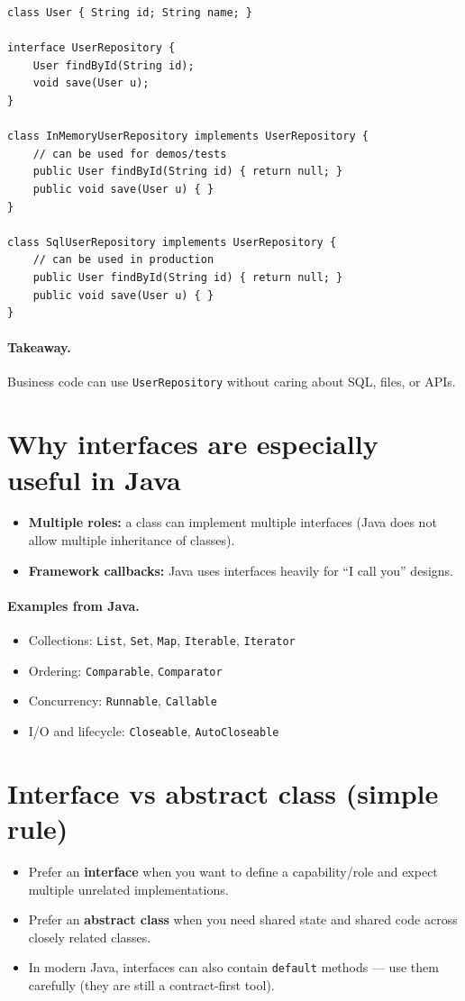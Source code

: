 \documentclass[11pt]{article}
\begin{document}
\begin{lstlisting}
class User { String id; String name; }

interface UserRepository {
    User findById(String id);
    void save(User u);
}

class InMemoryUserRepository implements UserRepository {
    // can be used for demos/tests
    public User findById(String id) { return null; }
    public void save(User u) { }
}

class SqlUserRepository implements UserRepository {
    // can be used in production
    public User findById(String id) { return null; }
    public void save(User u) { }
}
\end{lstlisting}

\paragraph{Takeaway.} Business code can use \texttt{UserRepository} without caring about SQL, files, or APIs.

\section*{Why interfaces are especially useful in Java}
\begin{itemize}
  \item \textbf{Multiple roles:} a class can implement multiple interfaces (Java does not allow multiple inheritance of classes).
  \item \textbf{Framework callbacks:} Java uses interfaces heavily for ``I call you'' designs.
\end{itemize}

\paragraph{Examples from Java.}
\begin{itemize}
  \item Collections: \texttt{List}, \texttt{Set}, \texttt{Map}, \texttt{Iterable}, \texttt{Iterator}
  \item Ordering: \texttt{Comparable}, \texttt{Comparator}
  \item Concurrency: \texttt{Runnable}, \texttt{Callable}
  \item I/O and lifecycle: \texttt{Closeable}, \texttt{AutoCloseable}
\end{itemize}

\section*{Interface vs abstract class (simple rule)}
\begin{itemize}
  \item Prefer an \textbf{interface} when you want to define a capability/role and expect multiple unrelated implementations.
  \item Prefer an \textbf{abstract class} when you need shared state and shared code across closely related classes.
  \item In modern Java, interfaces can also contain \texttt{default} methods --- use them carefully (they are still a contract-first tool).
\end{itemize}
\end{document}
